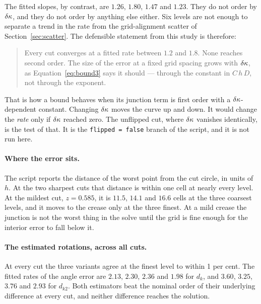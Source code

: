The fitted slopes, by contrast, are $1.26$, $1.80$, $1.47$ and $1.23$.
They do not order by $\delta\kappa$, and they do not order by anything else
either. Six levels are not enough to separate a trend in the rate from
the grid-alignment scatter of Section~\ref{sec:scatter}. The defensible
statement from this study is therefore:

\begin{quote}
  Every cut converges at a fitted rate between $1.2$ and $1.8$. None
  reaches second order. The size of the error at a fixed grid spacing
  grows with $\delta\kappa$, as Equation~\eqref{eq:bound3} says it should ---
  through the constant in $C\,h\,D$, not through the exponent.
\end{quote}

That is how a bound behaves when its junction term is first order with a
$\delta\kappa$-dependent constant. Changing $\delta\kappa$ moves the curve up and down. It
would change the \emph{rate} only if $\delta\kappa$ reached zero. The unflipped
cut, where $\delta\kappa$ vanishes identically, is the test of that. It is the
\texttt{flipped = false} branch of the script, and it is not run here.

\paragraph{Where the error sits.} The script reports the distance of the
worst point from the cut circle, in units of $h$. At the two sharpest
cuts that distance is within one cell at nearly every level. At the
mildest cut, $z=0.585$, it is $11.5$, $14.1$ and $16.6$ cells at the
three coarsest levels, and it moves to the crease only at the three
finest. At a mild crease the junction is not the worst thing in the
solve until the grid is fine enough for the interior error to fall below
it.

\paragraph{The estimated rotations, across all cuts.} At every cut the
three variants agree at the finest level to within 1 per cent. The
fitted rates of the angle error are $2.13$, $2.30$, $2.36$ and $1.98$
for $d_k$, and $3.60$, $3.25$, $3.76$ and $2.93$ for $d_{k2}$. Both
estimators beat the nominal order of their underlying difference at
every cut, and neither difference reaches the solution.
